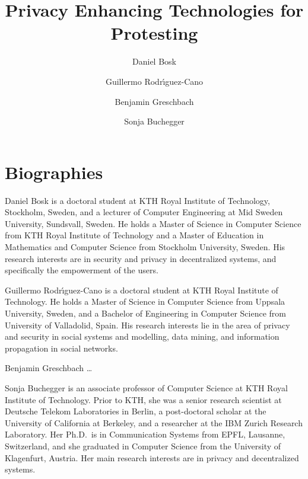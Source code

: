\documentclass{article}
\title{%
  Privacy Enhancing Technologies for
  Protesting
}
\author{Daniel Bosk}
\author{Guillermo Rodr\'{\i}guez-Cano}
\author{Benjamin Greschbach}
\author{Sonja Buchegger}
\affil{%
  School of Computer Science and Communication,\\
  KTH Royal Institute of Technology,
  Stockholm\\
  \email{\{dbosk,gurc,bgre,buc\}@kth.se}
}
\theoremstyle{definition}
\begin{document}
\maketitle

\begin{abstract}
  
\end{abstract}

\clearpage
\tableofcontents
\clearpage


\acresetall{}






\printbibliography{}


\appendix
\section{Biographies}
\label{Biography}

Daniel Bosk is a doctoral student at KTH Royal Institute of Technology, 
Stockholm, Sweden, and a lecturer of Computer Engineering at Mid Sweden 
University, Sundsvall, Sweden.
He holds a Master of Science in Computer Science from KTH Royal Institute of 
Technology and a Master of Education in Mathematics and Computer Science from 
Stockholm University, Sweden.
His research interests are in security and privacy in decentralized systems, 
and specifically the empowerment of the users.

Guillermo Rodr\'{\i}guez-Cano is a doctoral student at KTH Royal Institute of 
Technology.
He holds a Master of Science in Computer Science from Uppsala University, 
Sweden, and a Bachelor of Engineering in Computer Science from University of 
Valladolid, Spain.
His research interests lie in the area of privacy and security in social 
systems and modelling, data mining, and information propagation in social 
networks.

Benjamin Greschbach \dots

Sonja Buchegger is an associate professor of Computer Science at KTH Royal 
Institute of Technology.
Prior to KTH, she was a
senior research scientist at Deutsche Telekom Laboratories in Berlin,
a post-doctoral scholar at the University of California at Berkeley,
and a researcher at the IBM Zurich Research Laboratory.
Her Ph.D.\ is in Communication Systems from EPFL, Lausanne, Switzerland, and 
she graduated in Computer Science from the University of Klagenfurt, Austria.
Her main research interests are in privacy and decentralized systems.
\end{document}
